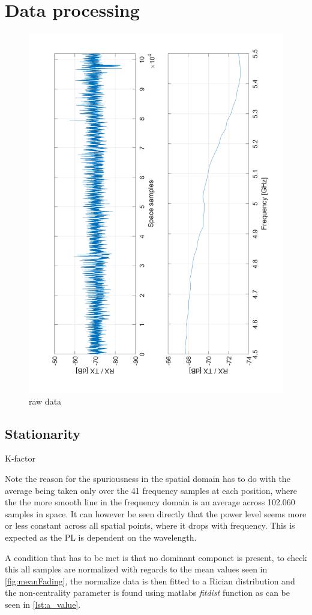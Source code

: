 \section{Data processing}
\begin{figure}[H]
\centering
\includegraphics[height = \textwidth, angle = -90]{figures/meanFading.pdf}
\caption{raw data}
\label{fig:meanFading}
\end{figure}


\subsection{Stationarity}
K-factor 

Note the reason for the spuriousness in the spatial domain has to do with the average being taken only over the 41 frequency samples at each position, where the the more smooth line in the frequency domain is an average across 102.060 samples in space. It can however be seen directly that the power level seems more or less constant across all spatial points, where it drops with frequency. This is expected as the \gls{PL} is dependent on the wavelength.  

A condition that has to be met is that no dominant componet is present, to check this all samples are normalized with regards to the mean values seen in \autoref{fig:meanFading}, the normalize data is then fitted to a Rician distribution and the non-centrality parameter is found using matlabs \textit{fitdist} function as can be seen in \autoref{lst:a_value}. 

